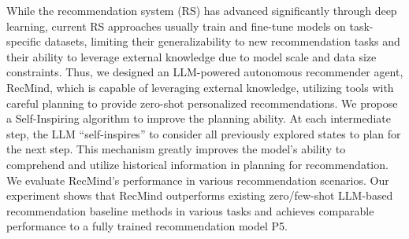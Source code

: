 While the recommendation system (RS) has advanced significantly through deep learning, current RS approaches usually train and fine-tune models on task-specific datasets, limiting their generalizability to new recommendation tasks and their ability to leverage external knowledge due to model scale and data size constraints. Thus, we designed an LLM-powered autonomous recommender agent, RecMind, which is capable of leveraging external knowledge, utilizing tools with careful planning to provide zero-shot personalized recommendations. We propose a Self-Inspiring algorithm to improve the planning ability. At each intermediate step, the LLM “self-inspires” to consider all previously explored states to plan for the next step. This mechanism greatly improves the model’s ability to comprehend and utilize historical information in planning for recommendation. We evaluate RecMind's performance in various recommendation scenarios. Our experiment shows that RecMind outperforms existing zero/few-shot LLM-based recommendation baseline methods in various tasks and achieves comparable performance to a fully trained recommendation model P5.